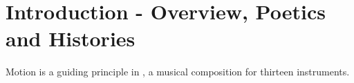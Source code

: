 \chapter{Introduction - Overview, Poetics and Histories}

Motion is a guiding principle in \compositionTitle, a musical composition for thirteen instruments.
